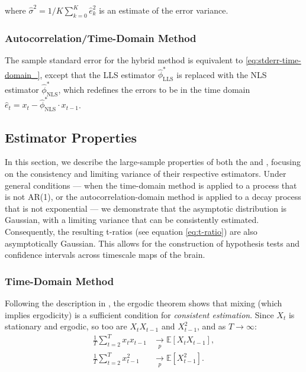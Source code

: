 \documentclass[docs/main.tex]{subfiles}
\begin{document}
\noindent where $\hat\sigma^2 = 1/K \sum_{k=0}^K \hat e_k^2$ is an estimate of the error variance.\\

\subsubsection{Autocorrelation/Time-Domain Method}\label{sec:stderr-autocorrelation/time-domain_}
The sample standard error for the hybrid method is equivalent to \eqref{eq:stderr-time-domain_}, except that the LLS estimator $\hat\phi^*_{\scriptscriptstyle\text{LLS}}$ is replaced with the NLS estimator $\hat\phi^*_{\scriptscriptstyle\text{NLS}}$, which redefines the errors to be in the time domain $\hat e_t = x_t - \hat\phi^*_{\scriptscriptstyle\text{NLS}} \cdot x_{t-1}$.

\subsection{Estimator Properties}\label{sec:estimator-properties}
In this section, we describe the large-sample properties of both the  and , focusing on the consistency and limiting variance of their respective estimators. Under general conditions --- when the time-domain method is applied to a process that is not AR(1), or the autocorrelation-domain method is applied to a decay process that is not exponential --- we demonstrate that the asymptotic distribution is Gaussian, with a limiting variance that can be consistently estimated. Consequently, the resulting t-ratios (see equation \eqref{eq:t-ratio}) are also asymptotically Gaussian. This allows for the construction of hypothesis tests and confidence intervals across timescale maps of the brain.

\subsubsection{Time-Domain Method}
Following the description in \citet[Theorem~14.29]{hansen_econometrics_2022}, the ergodic theorem shows that mixing (which implies ergodicity) is a sufficient condition for \textit{consistent estimation}. Since $X_t$ is stationary and ergodic, so too are $X_t X_{t-1}$ and $X_{t-1}^2$, and as $T \to \infty$:
\begin{align}
    \frac{1}{T} \sum_{t=2}^T x_t x_{t-1} &\underset{p}{\to} \mathbb{E}[X_t X_{t-1}],\\
    \frac{1}{T} \sum_{t=2}^T x_{t-1}^2 &\underset{p}{\to} \mathbb{E}[X_{t-1}^2].
\end{align}
\end{document}
